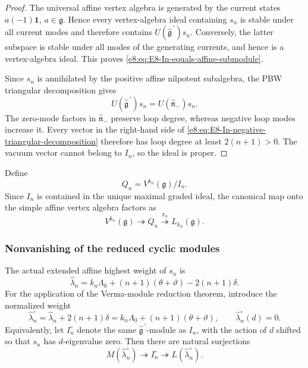 \documentclass[11pt,reqno]{amsart}
\theoremstyle{definition}
\theoremstyle{remark}
\providecommand{\Vac}{\mathbf{1}}
\providecommand{\g}{\mathfrak{g}}
\begin{document}
\begin{proof}
The universal affine vertex algebra is generated by the current states
$a(-1)\Vac$, $a\in\g$.  Hence every vertex-algebra ideal containing $s_n$ is
stable under all current modes and therefore contains
$U(\widehat{\g}^{\,\prime})s_n$.  Conversely, the latter subspace is stable
under all modes of the generating currents, and hence is a vertex-algebra
ideal.  This proves \eqref{e8:eq:E8-In-equals-affine-submodule}.

Since $s_n$ is annihilated by the positive affine nilpotent subalgebra, the
PBW triangular decomposition gives
\begin{equation}
  U(\widehat{\g}^{\,\prime})s_n
  =U(\widehat{\mathfrak n}_{-})s_n.
  \label{e8:eq:E8-In-negative-triangular-decomposition}
\end{equation}
The zero-mode factors in $\widehat{\mathfrak n}_{-}$ preserve loop degree,
whereas negative loop modes increase it.  Every vector in the right-hand side
of \eqref{e8:eq:E8-In-negative-triangular-decomposition} therefore has loop
degree at least $2(n+1)>0$.  The vacuum vector cannot belong to $I_n$, so the
ideal is proper.
\end{proof}

Define
\begin{equation}
  Q_n=V^{k_n}(\g)/I_n.
  \label{e8:eq:E8-definition-Qn}
\end{equation}
Since $I_n$ is contained in the unique maximal graded ideal, the canonical
map onto the simple affine vertex algebra factors as
\begin{equation}
  V^{k_n}(\g)\twoheadrightarrow Q_n
  \overset{\pi_n}{\twoheadrightarrow}L_{k_n}(\g).
  \label{e8:eq:E8-Qn-to-simple-affine}
\end{equation}

\subsubsection{Nonvanishing of the reduced cyclic modules}


The actual extended affine highest weight of $s_n$ is
\begin{equation*}
  \widehat\lambda_n
  =k_n\Lambda_0
   +(n+1)(\theta+\vartheta)
   -2(n+1)\delta.
\end{equation*}
For the application of the Verma-module reduction theorem, introduce the
normalized weight
\begin{equation*}
  \widehat\lambda_n^{\circ}
  =\widehat\lambda_n+2(n+1)\delta
  =k_n\Lambda_0+(n+1)(\theta+\vartheta),
  \qquad
  \widehat\lambda_n^{\circ}(d)=0.
\end{equation*}
Equivalently, let $I_n^{\circ}$ denote the same
$\widehat{\g}^{\,\prime}$-module as $I_n$, with the action of $d$ shifted so
that $s_n$ has $d$-eigenvalue zero.  Then there are natural surjections
\begin{equation}
  M(\widehat\lambda_n^{\circ})
  \twoheadrightarrow I_n^{\circ}
  \twoheadrightarrow L(\widehat\lambda_n^{\circ}).
  \label{e8:eq:E8-Verma-In-simple-surjections}
\end{equation}
\end{document}
